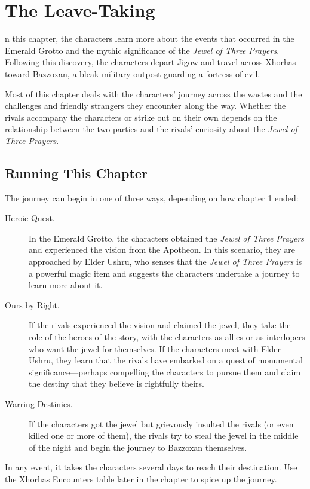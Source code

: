 \documentclass[10pt,a4paper,twoside,fancy,bg=print,twocolumn,openany,nodeprecatedcode]{dndbook}
\begin{document}
\chapter{The Leave-Taking}
n this chapter, the characters learn more about the events that occurred in the Emerald Grotto and the mythic significance of the \textit{Jewel of Three Prayers}. Following this discovery, the characters depart Jigow and travel across Xhorhas toward Bazzoxan, a bleak military outpost guarding a fortress of evil.


Most of this chapter deals with the characters' journey across the wastes and the challenges and friendly strangers they encounter along the way. Whether the rivals accompany the characters or strike out on their own depends on the relationship between the two parties and the rivals' curiosity about the \textit{Jewel of Three Prayers}.

\section{Running This Chapter}
The journey can begin in one of three ways, depending on how chapter 1 ended:


\begin{description}
\item[Heroic Quest.]
In the Emerald Grotto, the characters obtained the \textit{Jewel of Three Prayers} and experienced the vision from the Apotheon. In this scenario, they are approached by Elder Ushru, who senses that the \textit{Jewel of Three Prayers} is a powerful magic item and suggests the characters undertake a journey to learn more about it.
\item[Ours by Right.]
If the rivals experienced the vision and claimed the jewel, they take the role of the heroes of the story, with the characters as allies or as interlopers who want the jewel for themselves. If the characters meet with Elder Ushru, they learn that the rivals have embarked on a quest of monumental significance—perhaps compelling the characters to pursue them and claim the destiny that they believe is rightfully theirs.
\item[Warring Destinies.]
If the characters got the jewel but grievously insulted the rivals (or even killed one or more of them), the rivals try to steal the jewel in the middle of the night and begin the journey to Bazzoxan themselves.
\end{description}

In any event, it takes the characters several days to reach their destination. Use the Xhorhas Encounters table later in the chapter to spice up the journey.
\end{document}
